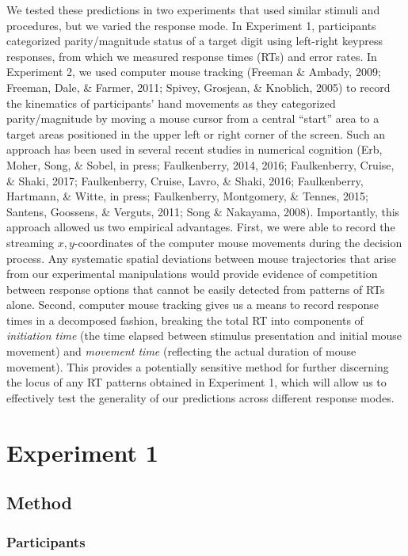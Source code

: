 \documentclass[english,man]{apa6}
\theoremstyle{definition}
\theoremstyle{definition}
\theoremstyle{definition}
\theoremstyle{remark}
\begin{document}
We tested these predictions in two experiments that used similar stimuli
and procedures, but we varied the response mode. In Experiment 1,
participants categorized parity/magnitude status of a target digit using
left-right keypress responses, from which we measured response times
(RTs) and error rates. In Experiment 2, we used computer mouse tracking
(Freeman \& Ambady, 2009; Freeman, Dale, \& Farmer, 2011; Spivey,
Grosjean, \& Knoblich, 2005) to record the kinematics of participants'
hand movements as they categorized parity/magnitude by moving a mouse
cursor from a central \enquote{start} area to a target areas positioned
in the upper left or right corner of the screen. Such an approach has
been used in several recent studies in numerical cognition (Erb, Moher,
Song, \& Sobel, in press; Faulkenberry, 2014, 2016; Faulkenberry,
Cruise, \& Shaki, 2017; Faulkenberry, Cruise, Lavro, \& Shaki, 2016;
Faulkenberry, Hartmann, \& Witte, in press; Faulkenberry, Montgomery, \&
Tennes, 2015; Santens, Goossens, \& Verguts, 2011; Song \& Nakayama,
2008). Importantly, this approach allowed us two empirical advantages.
First, we were able to record the streaming \(x,y\)-coordinates of the
computer mouse movements during the decision process. Any systematic
spatial deviations between mouse trajectories that arise from our
experimental manipulations would provide evidence of competition between
response options that cannot be easily detected from patterns of RTs
alone. Second, computer mouse tracking gives us a means to record
response times in a decomposed fashion, breaking the total RT into
components of \emph{initiation time} (the time elapsed between stimulus
presentation and initial mouse movement) and \emph{movement time}
(reflecting the actual duration of mouse movement). This provides a
potentially sensitive method for further discerning the locus of any RT
patterns obtained in Experiment 1, which will allow us to effectively
test the generality of our predictions across different response modes.

\section{Experiment 1}\label{experiment-1}

\subsection{Method}\label{method}

\subsubsection{Participants}\label{participants}
\end{document}
